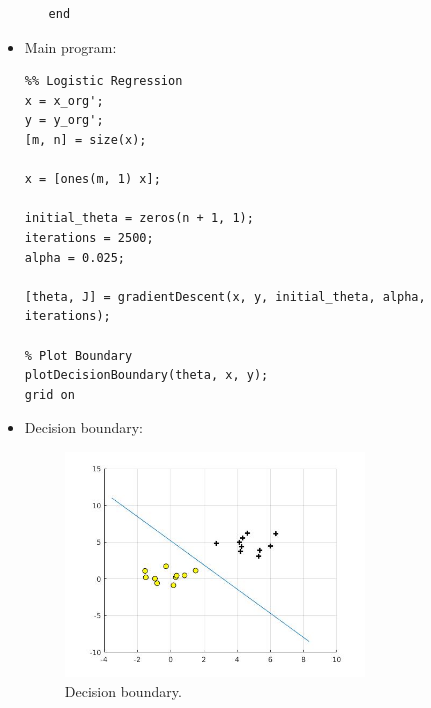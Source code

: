 \documentclass[12pt]{article}
\begin{document}
\begin{itemize}
\begin{itemize}
\begin{lstlisting}
end

\end{lstlisting}

        \end{itemize}

\item Main program:
\begin{lstlisting}
%% Logistic Regression
x = x_org';
y = y_org';
[m, n] = size(x); 

x = [ones(m, 1) x];

initial_theta = zeros(n + 1, 1);
iterations = 2500;
alpha = 0.025;

[theta, J] = gradientDescent(x, y, initial_theta, alpha, iterations);

% Plot Boundary
plotDecisionBoundary(theta, x, y);
grid on

\end{lstlisting}

\item Decision boundary:
\begin{figure}[H]
\begin{center}
  \caption{Decision boundary.}
  \includegraphics[width=0.75\textwidth]{images/Fig2-2.jpg}
 \end{center}
\end{figure}
\end{itemize}
 
\end{document}

